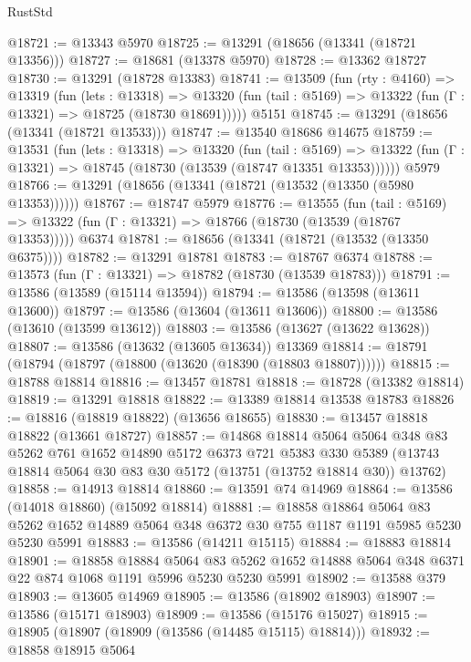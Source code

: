 \begin{lexlean}{RustStd}
\begin{coremodule}
@18721 := @13343 @5970
@18725 := @13291 (@18656 (@13341 (@18721 @13356)))
@18727 := @18681 (@13378 @5970)
@18728 := @13362 @18727
@18730 := @13291 (@18728 @13383)
@18741 := @13509
    (fun (rty : @4160) =>
    @13319
      (fun (lets : @13318) =>
      @13320 (fun (tail : @5169) => @13322 (fun (Γ : @13321) => @18725 (@18730 @18691)))))
    @5151
@18745 := @13291 (@18656 (@13341 (@18721 @13533)))
@18747 := @13540 @18686 @14675
@18759 := @13531
    (fun (lets : @13318) =>
    @13320
      (fun (tail : @5169) =>
      @13322 (fun (Γ : @13321) => @18745 (@18730 (@13539 (@18747 @13351 @13353))))))
    @5979
@18766 := @13291 (@18656 (@13341 (@18721 (@13532 (@13350 (@5980 @13353))))))
@18767 := @18747 @5979
@18776 := @13555
    (fun (tail : @5169) => @13322 (fun (Γ : @13321) => @18766 (@18730 (@13539 (@18767 @13353)))))
    @6374
@18781 := @18656 (@13341 (@18721 (@13532 (@13350 @6375))))
@18782 := @13291 @18781
@18783 := @18767 @6374
@18788 := @13573 (fun (Γ : @13321) => @18782 (@18730 (@13539 @18783)))
@18791 := @13586 (@13589 (@15114 @13594))
@18794 := @13586 (@13598 (@13611 @13600))
@18797 := @13586 (@13604 (@13611 @13606))
@18800 := @13586 (@13610 (@13599 @13612))
@18803 := @13586 (@13627 (@13622 @13628))
@18807 := @13586 (@13632 (@13605 @13634)) @13369
@18814 := @18791 (@18794 (@18797 (@18800 (@13620 (@18390 (@18803 @18807))))))
@18815 := @18788 @18814
@18816 := @13457 @18781
@18818 := @18728 (@13382 @18814)
@18819 := @13291 @18818
@18822 := @13389 @18814 @13538 @18783
@18826 := @18816 (@18819 @18822) (@13656 @18655)
@18830 := @13457 @18818 @18822 (@13661 @18727)
@18857 := @14868
    @18814
    @5064
    @5064
    @348
    @83
    @5262
    @761
    @1652
    @14890
    @5172
    @6373
    @721
    @5383
    @330
    @5389
    (@13743 @18814 @5064 @30 @83 @30 @5172 (@13751 (@13752 @18814 @30)) @13762)
@18858 := @14913 @18814
@18860 := @13591 @74 @14969
@18864 := @13586 (@14018 @18860) (@15092 @18814)
@18881 := @18858
    @18864
    @5064
    @83
    @5262
    @1652
    @14889
    @5064
    @348
    @6372
    @30
    @755
    @1187
    @1191
    @5985
    @5230
    @5230
    @5991
@18883 := @13586 (@14211 @15115)
@18884 := @18883 @18814
@18901 := @18858
    @18884
    @5064
    @83
    @5262
    @1652
    @14888
    @5064
    @348
    @6371
    @22
    @874
    @1068
    @1191
    @5996
    @5230
    @5230
    @5991
@18902 := @13588 @379
@18903 := @13605 @14969
@18905 := @13586 (@18902 @18903)
@18907 := @13586 (@15171 @18903)
@18909 := @13586 (@15176 @15027)
@18915 := @18905 (@18907 (@18909 (@13586 (@14485 @15115) @18814)))
@18932 := @18858
    @18915
    @5064

\end{coremodule}
\end{lexlean}
